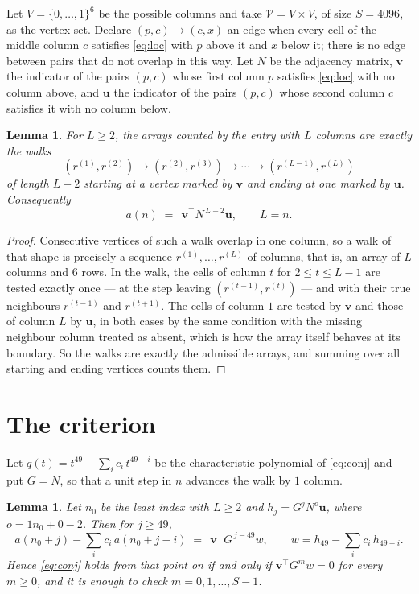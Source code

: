 \documentclass[11pt,a4paper]{article}
\theoremstyle{plain}
\newtheorem{lemma}[theorem]{Lemma}
\theoremstyle{definition}
\begin{document}
Let $V=\{0,\dots,1\}^{6}$ be the possible columns and take
$\mathcal V=V\times V$, of size $S=4096$, as the vertex set. Declare $(p,c)\to(c,x)$ an edge
when every cell of the middle column $c$ satisfies \eqref{eq:loc} with $p$ above it and $x$
below it; there is no edge between pairs that do not overlap in this way. Let $N$ be the
adjacency matrix, $\mathbf{v}$ the indicator of the pairs $(p,c)$ whose first column $p$
satisfies \eqref{eq:loc} with no column above, and $\mathbf{u}$ the indicator of
the pairs $(p,c)$ whose second column $c$ satisfies it with no column below.

\begin{lemma}\label{lem:walk}
For $L\ge2$, the arrays counted by the entry with $L$ columns are exactly the walks
\[
(r^{(1)},r^{(2)})\to(r^{(2)},r^{(3)})\to\cdots\to(r^{(L-1)},r^{(L)})
\]
of length $L-2$ starting at a vertex marked by $\mathbf{v}$ and ending at one marked by
$\mathbf{u}$. Consequently
\[
a(n)\;=\;\,\mathbf{v}^{\!\top}N^{\,L-2}\mathbf{u},\qquad L=n .
\]
\end{lemma}

\begin{proof}
Consecutive vertices of such a walk overlap in one column, so a walk of that shape is
precisely a sequence $r^{(1)},\dots,r^{(L)}$ of columns, that is, an array of $L$ columns
and $6$ rows. In the walk, the cells of column $t$ for $2\le t\le L-1$ are tested
exactly once --- at the step leaving $(r^{(t-1)},r^{(t)})$ --- and with their true
neighbours $r^{(t-1)}$ and $r^{(t+1)}$. The cells of column $1$ are tested by
$\mathbf{v}$ and those of column $L$ by $\mathbf{u}$, in both cases by the same condition
with the missing neighbour column treated as absent, which is how the array itself behaves at
its boundary. So the walks are exactly the admissible arrays, and summing over all starting
and ending vertices counts them.
\end{proof}

\section{The criterion}

Let $q(t)=t^{49}-\sum_i c_i\,t^{49-i}$ be the characteristic polynomial of
\eqref{eq:conj} and put $G=N$, so that a unit step in $n$ advances the walk by
$1$ column.

\begin{lemma}\label{lem:crit}
Let $n_0$ be the least index with $L\ge2$ and $h_j=G^{j}N^{o}\mathbf{u}$, where
$o=1n_0+0-2$. Then for $j\ge49$,
\[
a(n_0+j)-\sum_i c_i\,a(n_0+j-i)\;=\;\,\mathbf{v}^{\!\top}G^{\,j-49}w,
\qquad w=h_{49}-\sum_i c_i\,h_{49-i} .
\]
Hence \eqref{eq:conj} holds from that point on if and only if
$\mathbf{v}^{\!\top}G^{m}w=0$ for every $m\ge0$, and it is enough to check
$m=0,1,\dots,S-1$.
\end{lemma}
\end{document}
